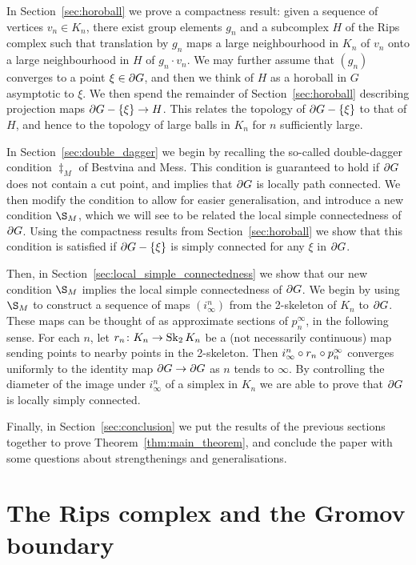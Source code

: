 \documentclass[a4paper]{article}
\begin{document}
In Section~\ref{sec:horoball} we prove a compactness result: given a sequence
of vertices $v_n \in K_n$, there exist group elements $g_n$ and a subcomplex
$H$ of the Rips complex such that translation by $g_n$ maps a large
neighbourhood in $K_n$ of $v_n$ onto a large neighbourhood in $H$ of $g_n\cdot
v_n$.  We may further assume that $(g_n)$ converges to a point $\xi \in
\partial G$, and then we think of $H$ as a horoball in $G$ asymptotic to
$\xi$. We then spend the remainder of Section~\ref{sec:horoball} describing
projection maps $\partial G - \left\{\xi\right\} \to H$. This relates the topology of
$\partial G - \left\{\xi\right\}$ to that of $H$, and hence to the topology of large
balls in $K_n$ for $n$ sufficiently large.

In Section~\ref{sec:double_dagger} we begin by recalling the so-called
double-dagger condition $\ddag_M$ of Bestvina and Mess. This condition is
guaranteed to hold if $\partial G$ does not contain a cut point, and implies
that $\partial G$ is locally path connected. We then modify the condition to
allow for easier generalisation, and introduce a new condition $\S_M$, which we
will see to be related the local simple connectedness of $\partial G$. Using
the compactness results from Section~\ref{sec:horoball} we show that this
condition is satisfied if $\partial G - \left\{\xi\right\}$ is simply connected for any
$\xi$ in $\partial G$.

Then, in Section~\ref{sec:local_simple_connectedness} we show that our new
condition $\S_M$ implies the local simple connectedness of $\partial G$. We
begin by using $\S_M$ to construct a sequence of maps $(i^n_\infty)$ from the
2-skeleton of $K_n$ to $\partial G$. These maps can be thought of as
approximate sections of $p^\infty_n$, in the following sense. For each $n$, let
$r_n\colon K_n \to \operatorname{Sk}_2 K_n$ be a (not necessarily continuous) map sending
points to nearby points in the 2-skeleton. Then $i^n_\infty\circ r_n
\circ p^\infty_n$ converges uniformly to the identity map $\partial G \to
\partial G$ as $n$ tends to $\infty$. By controlling the diameter of the image
under $i^n_\infty$ of a simplex in $K_n$ we are able to prove that $\partial
G$ is locally simply connected.

Finally, in Section~\ref{sec:conclusion} we put the results of the previous
sections together to prove Theorem~\ref{thm:main_theorem}, and conclude the
paper with some questions about strengthenings and generalisations.

\section{The Rips complex and the Gromov boundary}\label{sec:spheres}
\end{document}
